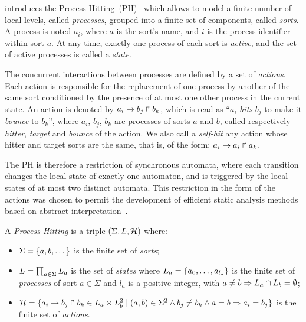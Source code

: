 

 introduces the Process Hitting~(PH)~\cite{PMR10-TCSB}
which allows to model a finite number of local levels,
called \emph{processes},
grouped into a finite set of components, called \emph{sorts}.
A process is noted $a_i$, where $a$ is the sort's name,
and $i$ is the process identifier within sort $a$.
At any time, exactly one process of each sort is \emph{active},
and the set of active processes is called a \emph{state}.

The concurrent interactions between processes are defined by a set of \emph{actions}.
Each action is responsible for the replacement of one process by another of the same sort
conditioned by the presence of at most one other process in the current state.
An action is denoted by $a_i\rightarrow b_j\Rsh b_k$, which is read as
“$a_i$ \emph{hits} $b_j$ to make it \emph{bounce} to $b_k$”,
where $a_i$, $b_j$, $b_k$ are processes of sorts $a$ and $b$,
called respectively \emph{hitter}, \emph{target} and
\emph{bounce} of the action.
We also call a \emph{self-hit} any action whose hitter and target sorts are the same,
that is, of the form: $a_i\rightarrow a_i\Rsh a_k$.

The PH is therefore a restriction of synchronous automata, where each transition
changes the local state of exactly one automaton,
and is triggered by the local states of at most two distinct automata.
This restriction in the form of the actions was chosen to permit
the development of efficient static analysis methods
based on abstract interpretation~\cite{PMR12-MSCS}.

\begin{definition}\label{def:PH}
  A \emph{Process Hitting} is a triple $(\Sigma,L,\mathcal{H})$ where:
  \begin{itemize}
    \item  $\Sigma = \{a,b,\dots\}$ is the finite set of \emph{sorts};
    \item  $L = \prod_{a\in\Sigma} L_a$ is the set of \emph{states} where
      $L_a = \{a_0,\dots,a_{l_a}\}$
      is the finite set of \emph{processes} of sort $a\in\Sigma$
      and $l_a$ is a positive integer, with $a\neq b\Rightarrow L_a \cap L_b = \emptyset$;
    \item  $\mathcal{H} = \{ a_i\rightarrow b_j\Rsh b_k \in L_a \times L_b^2 \mid
      (a,b) \in \Sigma^2 \wedge b_j\neq b_k \wedge a=b\Rightarrow a_i=b_j\}$
      is the finite set of \emph{actions}.
  \end{itemize}
\end{definition}


